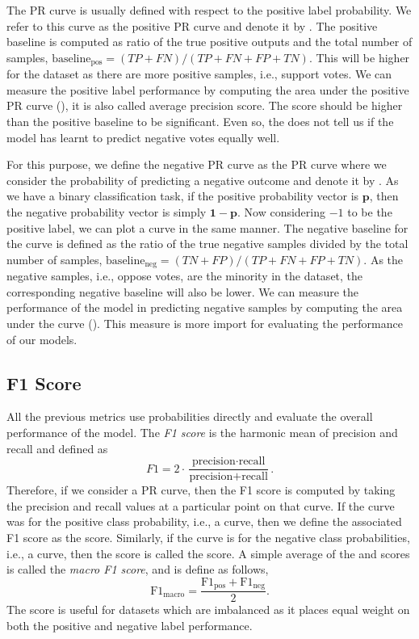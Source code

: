 The PR curve is usually defined with respect to the positive label probability.
We refer to this curve as the positive PR curve and denote it by \posPR.
The positive baseline is computed as ratio of the true positive outputs and the total number of samples, $\text{baseline}_{\text{pos}} = (TP+FN)/(TP+FN+FP+TN)$.
This will be higher for the \wikirfa dataset as there are more positive samples, i.e., support votes.
We can measure the positive label performance by computing the area under the positive PR curve (\aucposPR), it is also called average precision score.
The \aucposPR score should be higher than the positive baseline to be significant.
Even so, the \aucposPR does not tell us if the model has learnt to predict negative votes equally well.

For this purpose, we define the negative PR curve as the PR curve where we consider the probability of predicting a negative outcome and denote it by \negPR.
As we have a binary classification task, if the positive probability vector is $\mathbf{p}$, then the negative probability vector is simply $\mathbf{1}-\mathbf{p}$.
Now considering $-1$ to be the positive label, we can plot a \negPR curve in the same manner.
The negative baseline for the \negPR curve is defined as the ratio of the true negative samples divided by the total number of samples, $\text{baseline}_{\text{neg}} = (TN+FP)/(TP+FN+FP+TN)$.
As the negative samples, i.e., oppose votes, are the minority in the \wikirfa dataset, the corresponding negative baseline will also be lower.
We can measure the performance of the model in predicting negative samples by computing the area under the \negPR curve (\aucnegPR).
This measure is more import for evaluating the performance of our models.


\subsection{F1 Score}
All the previous metrics use probabilities directly and evaluate the overall performance of the model.
The \textit{F1 score} is the harmonic mean of precision and recall and defined as 
\[
    F1 = 2\cdot\frac{\text{precision}\cdot\text{recall}}{\text{precision}+\text{recall}}.
\]
Therefore, if we consider a PR curve, then the F1 score is computed by taking the precision and recall values at a particular point on that curve.
If the curve was for the positive class probability, i.e., a \posPR curve, then we define the associated F1 score as the \posF score.
Similarly, if the curve is for the negative class probabilities, i.e., a \negPR curve, then the score is called the \negF score.
A simple average of the \posF and \negF scores is called the \textit{macro F1 score}, and is define as follows,
\[ 
    \text{F1}_{\text{macro}} = \frac{\text{F1}_{\text{pos}}+\text{F1}_{\text{neg}}}{2}.
\]
The \macroF score is useful for datasets which are imbalanced as it places equal weight on both the positive and negative label performance.


